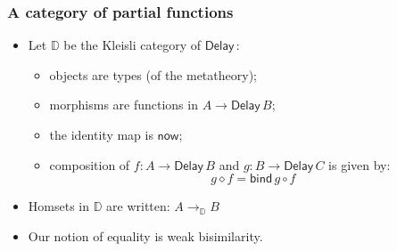 \documentclass[12pt,t]{beamer}
\newcommand{\comp}{\circ}
\newcommand{\Delay}{\ensuremath{\mathsf{Delay}\,}}
\newcommand{\now}{\mathsf{now}}
\newcommand{\bind}{\mathsf{bind}}
\newcommand{\D}{\mathbb{D}}
\newcommand{\Dapprox}{\mathbb{D}_{\approx}}
\begin{document}
\begin{frame}

  \frametitle{A category of partial functions}
  \begin{itemize}

  \item Let $\D$ be the Kleisli category of $\Delay$:
    \begin{itemize}
    \item objects are types (of the metatheory);
    \item morphisms are functions in $A \to \Delay B$;
    \item the identity map is $\now$;
    \item composition of $f : A \to \Delay B$ and $g : B \to \Delay C$
      is given by:
      \[g \diamond f = \bind\,g \comp f\]
    \end{itemize}
  \item Homsets in $\D$ are written: $A \to_\D B$
    \item Our notion of equality is weak bisimilarity.
  \end{itemize}
  
\end{frame}

  
\end{document}
